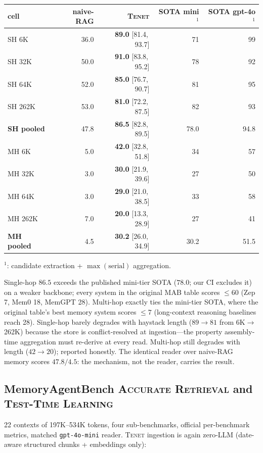 \documentclass[11pt]{article}
\newcommand{\tenet}{\textsc{Tenet}}
\newcommand{\ci}[2]{{\footnotesize[#1,\,#2]}}
\begin{document}
\begin{center}
\small
\begin{tabular}{lrrrr}
\toprule
cell & naive-RAG & \tenet{} & SOTA mini$^{1}$ & SOTA gpt-4o$^{1}$\\
\midrule
SH 6K & 36.0 & \textbf{89.0} \ci{81.4}{93.7} & 71 & 99\\
SH 32K & 50.0 & \textbf{91.0} \ci{83.8}{95.2} & 78 & 92\\
SH 64K & 52.0 & \textbf{85.0} \ci{76.7}{90.7} & 81 & 95\\
SH 262K & 53.0 & \textbf{81.0} \ci{72.2}{87.5} & 82 & 93\\
\textbf{SH pooled} & 47.8 & \textbf{86.5} \ci{82.8}{89.5} & 78.0 & 94.8\\
\midrule
MH 6K & 5.0 & \textbf{42.0} \ci{32.8}{51.8} & 34 & 57\\
MH 32K & 3.0 & \textbf{30.0} \ci{21.9}{39.6} & 27 & 50\\
MH 64K & 3.0 & \textbf{29.0} \ci{21.0}{38.5} & 33 & 58\\
MH 262K & 7.0 & \textbf{20.0} \ci{13.3}{28.9} & 27 & 41\\
\textbf{MH pooled} & 4.5 & \textbf{30.2} \ci{26.0}{34.9} & 30.2 & 51.5\\
\bottomrule
\end{tabular}

$^{1}$\cite{freshness}: candidate extraction + $\max(\text{serial})$ aggregation.
\end{center}

Single-hop $86.5$ exceeds the published mini-tier SOTA ($78.0$; our CI excludes it) on a
weaker backbone; every system in the original MAB table scores $\le 60$ (Zep 7, Mem0 18,
MemGPT 28). Multi-hop exactly ties the mini-tier SOTA, where the original table's best
memory system scores $\le 7$ (long-context reasoning baselines reach 28). Single-hop barely degrades with haystack length ($89\!\to\!81$ from
6K$\to$262K) because the store is conflict-resolved at ingestion---the property
assembly-time aggregation must re-derive at every read. Multi-hop still degrades with
length ($42\!\to\!20$); reported honestly. The identical reader over naive-RAG memory
scores $47.8/4.5$: the mechanism, not the reader, carries the result.

\subsection{MemoryAgentBench \textsc{Accurate Retrieval} and \textsc{Test-Time Learning}}\label{sec:mab}
22 contexts of 197K--534K tokens, four sub-benchmarks, official per-benchmark metrics,
matched \texttt{gpt-4o-mini} reader. \tenet{} ingestion is again zero-LLM (date-aware
structured chunks + embeddings only):
\end{document}
